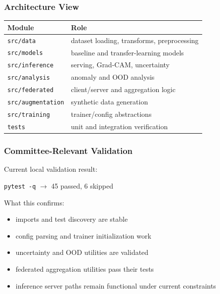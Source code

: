 \documentclass{beamer}
\begin{document}
\begin{frame}
  \frametitle{Architecture View}
  \begin{center}
    \begin{tabular}{ll}
      \toprule
      \textbf{Module} & \textbf{Role} \\
      \midrule
      \texttt{src/data} & dataset loading, transforms, preprocessing \\
      \texttt{src/models} & baseline and transfer-learning models \\
      \texttt{src/inference} & serving, Grad-CAM, uncertainty \\
      \texttt{src/analysis} & anomaly and OOD analysis \\
      \texttt{src/federated} & client/server and aggregation logic \\
      \texttt{src/augmentation} & synthetic data generation \\
      \texttt{src/training} & trainer/config abstractions \\
      \texttt{tests} & unit and integration verification \\
      \bottomrule
    \end{tabular}
  \end{center}
\end{frame}

\begin{frame}
  \frametitle{Committee-Relevant Validation}
  Current local validation result:

  \vspace{0.3cm}
  \begin{center}
    \Large{\texttt{pytest -q} $\rightarrow$ 45 passed, 6 skipped}
  \end{center}

  \vspace{0.4cm}
  What this confirms:

  \begin{itemize}
    \item imports and test discovery are stable
    \item config parsing and trainer initialization work
    \item uncertainty and OOD utilities are validated
    \item federated aggregation utilities pass their tests
    \item inference server paths remain functional under current constraints
  \end{itemize}
\end{frame}
\end{document}
